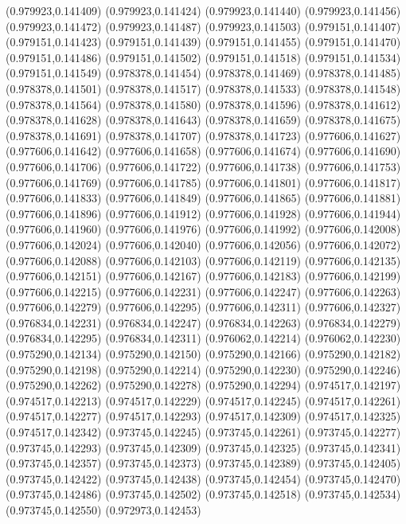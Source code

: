 (0.979923,0.141409)
(0.979923,0.141424)
(0.979923,0.141440)
(0.979923,0.141456)
(0.979923,0.141472)
(0.979923,0.141487)
(0.979923,0.141503)
(0.979151,0.141407)
(0.979151,0.141423)
(0.979151,0.141439)
(0.979151,0.141455)
(0.979151,0.141470)
(0.979151,0.141486)
(0.979151,0.141502)
(0.979151,0.141518)
(0.979151,0.141534)
(0.979151,0.141549)
(0.978378,0.141454)
(0.978378,0.141469)
(0.978378,0.141485)
(0.978378,0.141501)
(0.978378,0.141517)
(0.978378,0.141533)
(0.978378,0.141548)
(0.978378,0.141564)
(0.978378,0.141580)
(0.978378,0.141596)
(0.978378,0.141612)
(0.978378,0.141628)
(0.978378,0.141643)
(0.978378,0.141659)
(0.978378,0.141675)
(0.978378,0.141691)
(0.978378,0.141707)
(0.978378,0.141723)
(0.977606,0.141627)
(0.977606,0.141642)
(0.977606,0.141658)
(0.977606,0.141674)
(0.977606,0.141690)
(0.977606,0.141706)
(0.977606,0.141722)
(0.977606,0.141738)
(0.977606,0.141753)
(0.977606,0.141769)
(0.977606,0.141785)
(0.977606,0.141801)
(0.977606,0.141817)
(0.977606,0.141833)
(0.977606,0.141849)
(0.977606,0.141865)
(0.977606,0.141881)
(0.977606,0.141896)
(0.977606,0.141912)
(0.977606,0.141928)
(0.977606,0.141944)
(0.977606,0.141960)
(0.977606,0.141976)
(0.977606,0.141992)
(0.977606,0.142008)
(0.977606,0.142024)
(0.977606,0.142040)
(0.977606,0.142056)
(0.977606,0.142072)
(0.977606,0.142088)
(0.977606,0.142103)
(0.977606,0.142119)
(0.977606,0.142135)
(0.977606,0.142151)
(0.977606,0.142167)
(0.977606,0.142183)
(0.977606,0.142199)
(0.977606,0.142215)
(0.977606,0.142231)
(0.977606,0.142247)
(0.977606,0.142263)
(0.977606,0.142279)
(0.977606,0.142295)
(0.977606,0.142311)
(0.977606,0.142327)
(0.976834,0.142231)
(0.976834,0.142247)
(0.976834,0.142263)
(0.976834,0.142279)
(0.976834,0.142295)
(0.976834,0.142311)
(0.976062,0.142214)
(0.976062,0.142230)
(0.975290,0.142134)
(0.975290,0.142150)
(0.975290,0.142166)
(0.975290,0.142182)
(0.975290,0.142198)
(0.975290,0.142214)
(0.975290,0.142230)
(0.975290,0.142246)
(0.975290,0.142262)
(0.975290,0.142278)
(0.975290,0.142294)
(0.974517,0.142197)
(0.974517,0.142213)
(0.974517,0.142229)
(0.974517,0.142245)
(0.974517,0.142261)
(0.974517,0.142277)
(0.974517,0.142293)
(0.974517,0.142309)
(0.974517,0.142325)
(0.974517,0.142342)
(0.973745,0.142245)
(0.973745,0.142261)
(0.973745,0.142277)
(0.973745,0.142293)
(0.973745,0.142309)
(0.973745,0.142325)
(0.973745,0.142341)
(0.973745,0.142357)
(0.973745,0.142373)
(0.973745,0.142389)
(0.973745,0.142405)
(0.973745,0.142422)
(0.973745,0.142438)
(0.973745,0.142454)
(0.973745,0.142470)
(0.973745,0.142486)
(0.973745,0.142502)
(0.973745,0.142518)
(0.973745,0.142534)
(0.973745,0.142550)
(0.972973,0.142453)
